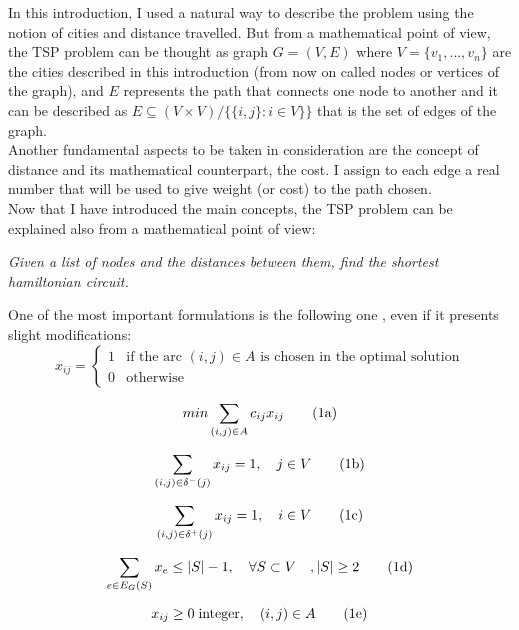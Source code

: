 In this introduction, I used a natural way to describe the problem using the notion of cities and distance travelled. But from a mathematical point of view, the TSP problem can be thought as graph $G=(V,E)$ where $V=\{v_1, \dots , v_n\}$ are the cities described in this introduction (from now on called nodes or vertices of the graph), and $E$ represents the path that connects one node to another and it can be described as $E \subseteq (V \times V) / \{\{i, j\}	:i \in V\}\}$ that is the set of edges of the graph.\\
Another fundamental aspects to be taken in consideration are the concept of distance and its mathematical counterpart, the cost. I assign to each edge a real number that will be used to give weight (or cost) to the path chosen.\\
Now that I have introduced the main concepts, the TSP problem can be explained also from a mathematical point of view:
\begin{displayquote}
	\textit{Given a list of nodes and the distances between them, find the shortest hamiltonian circuit.}
\end{displayquote}
One of the most important formulations is the following one \cite{ro1}, even if it presents slight modifications:
	\begin{equation}
	x_{ij}=
	\begin{cases}
	1 & \text{if the arc $(i, j) \in A$ is chosen in the optimal solution}\\
	0 & \text{otherwise}
	\end{cases}
	\end{equation}
	
	\begin{equation}
	\label{eqn:cost}
	min\sum_{(i,j)\in A}c_{ij}x_{ij}
	\stepcounter{equation}\tag{{\theequation}a}
	\end{equation}
	
	\begin{equation}
	\label{eqn:in}
	\sum_{(i,j)\in\delta^-(j)}x_{ij}=1, \quad j\in V
	\tag{{\theequation}b}
	\end{equation}
	
	\begin{equation}
	\label{eqn:out}
	\sum_{(i,j)\in \delta^+(j)}x_{ij}=1, \quad i\in V
	\tag{{\theequation}c}
	\end{equation}
	
	\begin{equation}
	\label{eqn:ragg}
	\sum_{e\in E_G(S)}x_{e}\le |S|-1, \quad \forall S \subset V\quad,|S|\ge 2
	\tag{{\theequation}d}
	\end{equation}
	
	\begin{equation}
	x_{ij}\ge 0 \; \text{integer} , \quad (i, j) \in A
	\tag{{\theequation}e}
	\end{equation}
